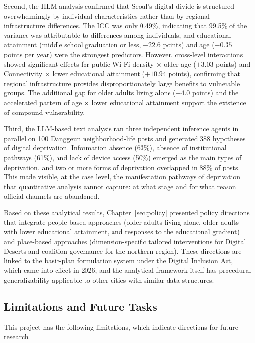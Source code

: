 Second, the HLM analysis confirmed that Seoul's digital divide is structured overwhelmingly by individual characteristics rather than by regional infrastructure differences. The ICC was only 0.49\%, indicating that 99.5\% of the variance was attributable to differences among individuals, and educational attainment (middle school graduation or less, $-22.6$ points) and age ($-0.35$ points per year) were the strongest predictors. However, cross-level interactions showed significant effects for public Wi-Fi density $\times$ older age ($+3.03$ points) and Connectivity $\times$ lower educational attainment ($+10.94$ points), confirming that regional infrastructure provides disproportionately large benefits to vulnerable groups. The additional gap for older adults living alone ($-4.0$ points) and the accelerated pattern of age $\times$ lower educational attainment support the existence of compound vulnerability.

Third, the LLM-based text analysis ran three independent inference agents in parallel on 100 Danggeun neighborhood-life posts and generated 388 hypotheses of digital deprivation. Information absence (63\%), absence of institutional pathways (61\%), and lack of device access (50\%) emerged as the main types of deprivation, and two or more forms of deprivation overlapped in 88\% of posts. This made visible, at the case level, the manifestation pathways of deprivation that quantitative analysis cannot capture: at what stage and for what reason official channels are abandoned.

Based on these analytical results, Chapter~\ref{sec:policy} presented policy directions that integrate people-based approaches (older adults living alone, older adults with lower educational attainment, and responses to the educational gradient) and place-based approaches (dimension-specific tailored interventions for Digital Deserts and coalition governance for the northern region). These directions are linked to the basic-plan formulation system under the Digital Inclusion Act, which came into effect in 2026, and the analytical framework itself has procedural generalizability applicable to other cities with similar data structures.

\subsection{Limitations and Future Tasks}
\label{subsec:5-2}

This project has the following limitations, which indicate directions for future research.

